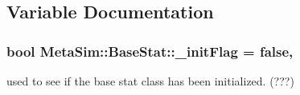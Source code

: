 \subsection{Variable Documentation}
\subsubsection[{\texorpdfstring{\+\_\+init\+Flag}{_initFlag}}]{\setlength{\rightskip}{0pt plus 5cm}bool Meta\+Sim\+::\+Base\+Stat\+::\+\_\+init\+Flag = false\hspace{0.3cm}{\ttfamily [static]}, {\ttfamily [protected]}}\hypertarget{group__metasim__stat_gac2cec74a9d6f8990cfb06fcd32327b60}{}\label{group__metasim__stat_gac2cec74a9d6f8990cfb06fcd32327b60}
used to see if the base stat class has been initialized. (???) 